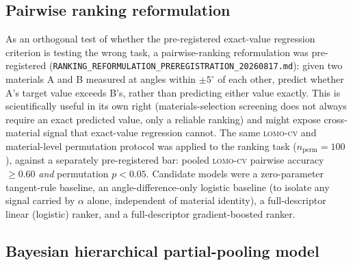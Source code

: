 \documentclass[aip,amsmath,amssymb,reprint]{revtex4-1}
\newcommand{\lomo}{\textsc{lomo-cv}}
\begin{document}
\subsection{Pairwise ranking reformulation}
\label{ssec:ranking_method}

As an orthogonal test of whether the pre-registered exact-value
regression criterion is testing the wrong task, a pairwise-ranking
reformulation was pre-registered
(\texttt{RANKING\_REFORMULATION\_PREREGISTRATION\_20260817.md}): given
two materials A and B measured at angles within $\pm 5^{\circ}$ of
each other, predict whether A's target value exceeds B's, rather than
predicting either value exactly. This is scientifically useful in its
own right (materials-selection screening does not always require an
exact predicted value, only a reliable ranking) and might expose
cross-material signal that exact-value regression cannot. The same
\lomo{} and material-level permutation protocol was applied to the
ranking task ($n_{\mathrm{perm}}=100$), against a separately
pre-registered bar: pooled \lomo{} pairwise accuracy $\geq 0.60$
\emph{and} permutation $p<0.05$. Candidate models were a zero-parameter
tangent-rule baseline, an angle-difference-only logistic baseline (to
isolate any signal carried by $\alpha$ alone, independent of material
identity), a full-descriptor linear (logistic) ranker, and a
full-descriptor gradient-boosted ranker.

\subsection{Bayesian hierarchical partial-pooling model}
\label{ssec:bayes_method}
\end{document}
